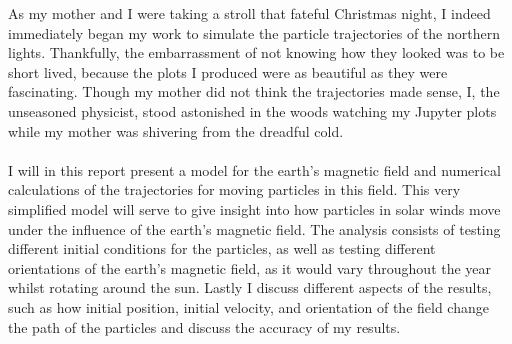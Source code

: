 As my mother and I were taking a stroll that fateful Christmas night, I indeed immediately began my work to simulate the particle trajectories of the northern lights. Thankfully, the embarrassment of not knowing how they looked was to be short lived, because the plots I produced were as beautiful as they were fascinating. Though my mother did not think the trajectories made sense, I, the unseasoned physicist, stood astonished in the woods watching my Jupyter plots while my mother was shivering from the dreadful cold.\\
\\
I will in this report present a model for the earth's magnetic field and numerical calculations of the trajectories for moving particles in this field. This very simplified model will serve to give insight into how particles in solar winds move under the influence of the earth's magnetic field. The analysis consists of testing different initial conditions for the particles, as well as testing different orientations of the earth's magnetic field, as it would vary throughout the year whilst rotating around the sun. Lastly I discuss different aspects of the results, such as how initial position, initial velocity, and orientation of the field change the path of the particles and discuss the accuracy of my results.
